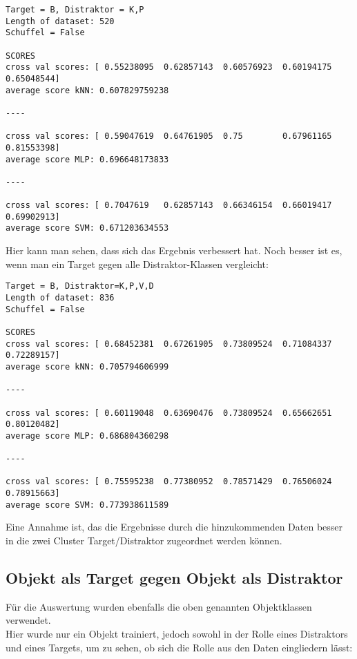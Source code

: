 \documentclass[]{report}
\begin{document}
\begin{lstlisting}
Target = B, Distraktor = K,P
Length of dataset: 520
Schuffel = False

SCORES
cross val scores: [ 0.55238095  0.62857143  0.60576923  0.60194175  0.65048544]
average score kNN: 0.607829759238

----

cross val scores: [ 0.59047619  0.64761905  0.75        0.67961165  0.81553398]
average score MLP: 0.696648173833

----

cross val scores: [ 0.7047619   0.62857143  0.66346154  0.66019417  0.69902913]
average score SVM: 0.671203634553
\end{lstlisting}
Hier kann man sehen, dass sich das Ergebnis verbessert hat. Noch besser ist es, wenn man ein Target gegen alle Distraktor-Klassen vergleicht:
\begin{lstlisting}
Target = B, Distraktor=K,P,V,D
Length of dataset: 836
Schuffel = False

SCORES
cross val scores: [ 0.68452381  0.67261905  0.73809524  0.71084337  0.72289157]
average score kNN: 0.705794606999

----

cross val scores: [ 0.60119048  0.63690476  0.73809524  0.65662651  0.80120482]
average score MLP: 0.686804360298

----

cross val scores: [ 0.75595238  0.77380952  0.78571429  0.76506024  0.78915663]
average score SVM: 0.773938611589
\end{lstlisting}
Eine Annahme ist, das die Ergebnisse durch die hinzukommenden Daten besser in die zwei Cluster Target/Distraktor zugeordnet werden können.

\subsection*{Objekt als Target gegen Objekt als Distraktor}
Für die Auswertung wurden ebenfalls die oben genannten Objektklassen verwendet.\\
Hier wurde nur ein Objekt trainiert, jedoch sowohl in der Rolle eines Distraktors und eines Targets, um zu sehen, ob sich die Rolle aus den Daten eingliedern lässt:
\end{document}
